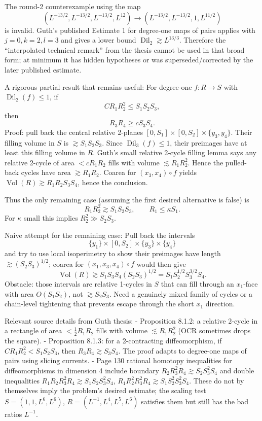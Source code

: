 \documentclass[12pt]{article}
\newcommand{\Dil}{\operatorname{Dil}}
\newcommand{\Vol}{\operatorname{Vol}}
\begin{document}
The round-2 counterexample using the map
\[
(L^{-13/2},L^{-13/2},L^{-13/2},L^{12})\to
(L^{-13/2},L^{-13/2},1,L^{11/2})
\]
is invalid.  Guth's published Estimate 1 for degree-one maps of pairs applies with
\(j=0,k=2,l=3\) and gives a lower bound \(\Dil_2\gtrsim L^{13/3}\).  Therefore the
``interpolated technical remark'' from the thesis cannot be used in that broad form;
at minimum it has hidden hypotheses or was superseded/corrected by the later
published estimate.

A rigorous partial result that remains useful:
For degree-one \(f:R\to S\) with \(\Dil_2(f)\le1\), if
\[
 C R_1R_2^2 \le S_1S_2S_3,
\]
then
\[
 R_3R_4\ge cS_3S_4.
\]
Proof: pull back the central relative 2-planes
\([0,S_1]\times[0,S_2]\times\{y_3,y_4\}\).  Their filling volume in \(S\) is
\(\gtrsim S_1S_2S_3\).  Since \(\Dil_3(f)\le1\), their preimages have at least this
filling volume in \(R\).  Guth's small relative 2-cycle filling lemma says any
relative 2-cycle of area \(<cR_1R_2\) fills with volume \(\lesssim R_1R_2^2\).  Hence
the pulled-back cycles have area \(\gtrsim R_1R_2\).  Coarea for
\((x_3,x_4)\circ f\) yields \(\Vol(R)\gtrsim R_1R_2S_3S_4\), hence the conclusion.

Thus the only remaining case (assuming the first desired alternative is false) is
\[
 R_1R_2^2\gtrsim S_1S_2S_3,\qquad R_1\le\kappa S_1.
\]
For \(\kappa\) small this implies \(R_2^2\gg S_2S_3\).

Naive attempt for the remaining case:
Pull back the intervals
\[
\{y_1\}\times[0,S_2]\times\{y_3\}\times\{y_4\}
\]
and try to use local isoperimetry to show their preimages have length
\(\gtrsim (S_2S_3)^{1/2}\); coarea for \((x_1,x_3,x_4)\circ f\) would then give
\[
 \Vol(R)\gtrsim S_1S_3S_4(S_2S_3)^{1/2}
 =S_1S_2^{1/2}S_3^{3/2}S_4.
\]
Obstacle: those intervals are relative 1-cycles in \(S\) that can fill through an
\(x_1\)-face with area \(O(S_1S_2)\), not \(\gtrsim S_2S_3\).  Need a genuinely mixed
family of cycles or a chain-level tightening that prevents escape through the short
\(x_1\) direction.

Relevant source details from Guth thesis:
- Proposition 8.1.2: a relative 2-cycle in a rectangle of area \(<\frac12 R_1R_2\)
  fills with volume \(\lesssim R_1R_2^2\) (OCR sometimes drops the square).
- Proposition 8.1.3: for a 2-contracting diffeomorphism, if
  \(CR_1R_2^2<S_1S_2S_3\), then \(R_3R_4\gtrsim S_3S_4\).  The proof adapts to
  degree-one maps of pairs using slicing currents.
- Page 130 rational homotopy inequalities for diffeomorphisms in dimension 4 include
  boundary \(R_2R_3^2R_4\gtrsim S_2S_3^2S_4\) and double inequalities
  \(R_1R_2R_3^2R_4\gtrsim S_1S_2S_3^2S_4\),
  \(R_1R_2^2R_3^2R_4\gtrsim S_1S_2^2S_3^2S_4\).  These do not by themselves imply
  the problem's desired estimate; the scaling test \(S=(1,1,L^6,L^6)\),
  \(R=(L^{-1},L^4,L^5,L^6)\) satisfies them but still has the bad ratios \(L^{-1}\).
\end{document}
